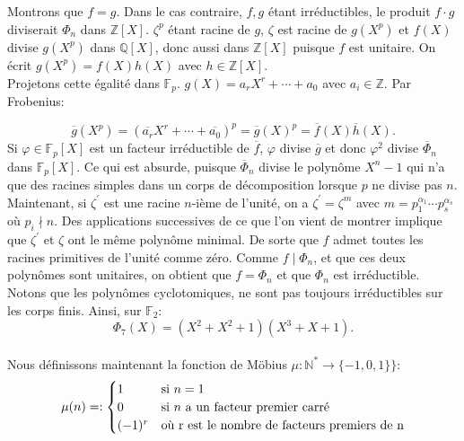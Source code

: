 \documentclass{article}
\theoremstyle{break}                  %
\begin{document}
Montrons que $f=g$. Dans le cas contraire, $f,g$ étant irréductibles, le produit $f \cdot g$ diviserait $\Phi_n$ dans $\mathbb Z[X]$. $\zeta^p$ étant racine de $g$, $\zeta$ est racine de $g(X^p)$ et $f(X)$ divise $g(X^p)$ dans $\mathbb Q[X]$, donc aussi dans $\mathbb Z[X]$ puisque $f$ est unitaire. On écrit $g(X^p) = f(X)h(X)$ avec $h \in \mathbb Z[X]$.\\

Projetons cette égalité dans $\mathbb F_p$. $g(X) = a_r X^r + \cdots + a_0$ avec $a_i \in \mathbb Z$. Par Frobenius:

$$\overline{g}(X^p) = (\overline{a_r} X^r + \cdots + \overline{a_0})^p = \overline{g}(X)^p = \overline{f}(X) \overline{h}(X).$$ Si $\varphi \in \mathbb F_p[X]$ est un facteur irréductible de $\overline{f}$, $\varphi$ divise $\overline{g}$ et donc $\varphi^2$ divise $\overline{\Phi}_n$ dans $\mathbb F_p[X]$. Ce qui est absurde, puisque $\overline{\Phi}_n$ divise le polynôme $X^n-1$ qui n'a que des racines simples dans un corps de décomposition lorsque $p$ ne divise pas $n$.\\

Maintenant, si $\zeta^\prime$ est une racine $n$-ième de l'unité, on a $\zeta^\prime = \zeta^m$ avec $m = p_1^{\alpha_1} \cdots p_s^{\alpha_s}$ où $p_i \nmid n$. Des applications successives de ce que l'on vient de montrer implique que $\zeta^\prime$ et $\zeta$ ont le même polynôme minimal. De sorte que $f$ admet toutes les racines primitives de l'unité comme zéro. Comme $f \mid \Phi_n$, et que ces deux polynômes sont unitaires, on obtient que $f = \Phi_n$ et que $\Phi_n$ est irréductible.\\



Notons que les polynômes cyclotomiques, ne sont pas toujours irréductibles sur les corps finis. Ainsi, sur $\mathbb F_2$:
$$\Phi_7(X)= (X^2+X^2+1)(X^3+X+1).$$\\


Nous définissons maintenant la fonction de Möbius $\mu : \mathbb N^* \to \{-1, 0, 1\}\}$:
\begin{displaymath}
	\mu(n) = :
	\begin{cases}
		1 & \text{si } n = 1\\
		0 & \text{si } n \text{ a un facteur premier carré}\\
		(-1)^r & \text{où } $r$ \text{ est le nombre de facteurs premiers de } $n$\\
	\end{cases}
\end{displaymath}
\end{document}
